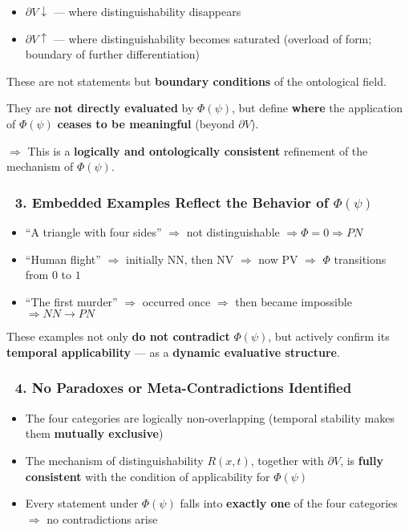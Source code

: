 \documentclass[12pt]{article}
\begin{document}
\begin{itemize}
\item $\partial V\downarrow$ — where distinguishability disappears
\item $\partial V\uparrow$ — where distinguishability becomes saturated (overload of form; boundary of further differentiation)
\end{itemize}

These are not statements but \textbf{boundary conditions} of the ontological field.

They are \textbf{not directly evaluated} by $\Phi(\psi)$, but define \textbf{where} the application of $\Phi(\psi)$ \textbf{ceases to be meaningful} (beyond $\partial V$).

$\Rightarrow$ This is a \textbf{logically and ontologically consistent} refinement of the mechanism of $\Phi(\psi)$.

\subsubsection*{🔹 3. Embedded Examples Reflect the Behavior of $\Phi(\psi)$}

\begin{itemize}
\item ``A triangle with four sides'' $\Rightarrow$ not distinguishable $\Rightarrow \Phi = 0 \Rightarrow PN$
\item ``Human flight'' $\Rightarrow$ initially NN, then NV $\Rightarrow$ now PV $\Rightarrow$ $\Phi$ transitions from $0$ to $1$
\item ``The first murder'' $\Rightarrow$ occurred once $\Rightarrow$ then became impossible $\Rightarrow NN \to PN$
\end{itemize}

These examples not only \textbf{do not contradict} $\Phi(\psi)$, but actively confirm its \textbf{temporal applicability} — as a \textbf{dynamic evaluative structure}.

\subsubsection*{🔹 4. No Paradoxes or Meta-Contradictions Identified}

\begin{itemize}
\item The four categories are logically non-overlapping (temporal stability makes them \textbf{mutually exclusive})
\item The mechanism of distinguishability $R(x, t)$, together with $\partial V$, is \textbf{fully consistent} with the condition of applicability for $\Phi(\psi)$
\item Every statement under $\Phi(\psi)$ falls into \textbf{exactly one} of the four categories $\Rightarrow$ no contradictions arise
\end{itemize}
\end{document}
